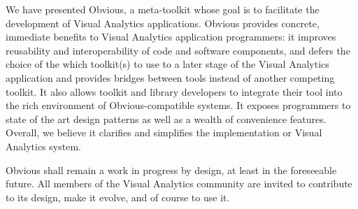 
We have presented Obvious, a meta-toolkit whose goal is to facilitate
the development of Visual Analytics applications.
Obvious provides concrete, immediate benefits to Visual Analytics
application programmers: it improves reusability and interoperability
of code and software components, and defers the choice of the which
toolkit(s) to use to a later stage of the Visual Analytics application
and provides bridges between tools instead of another competing
toolkit.  It also allows toolkit and library developers to integrate
their tool into the rich environment of Obvious-compatible systems.
It exposes programmers to state of the art design patterns as well as
a wealth of convenience features.  Overall, we believe it clarifies
and simplifies the implementation or Visual Analytics system.

Obvious shall remain a work in progress by design, at least in the
foreseeable future.  All members of the Visual Analytics community are
invited to contribute to its design, make it evolve, and of course to
use it.  
